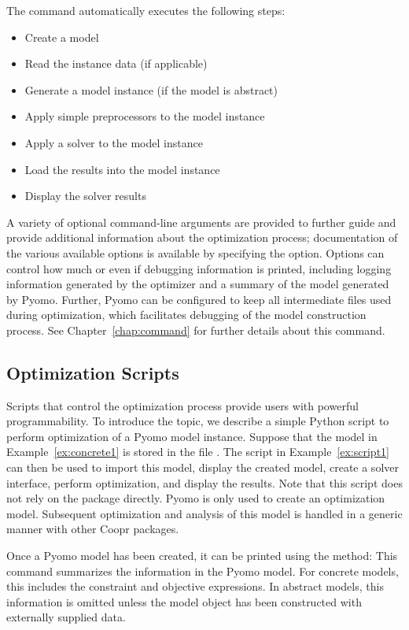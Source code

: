The  command automatically executes the following steps:
\begin{itemize}
\item Create a model
\item Read the instance data (if applicable)
\item Generate a model instance (if the model is abstract)
\item Apply simple preprocessors to the model instance
\item Apply a solver to the model instance
\item Load the results into the model instance
\item Display the solver results
\end{itemize}
A variety of optional command-line arguments are provided to further guide and 
provide additional information about the optimization process; documentation of
the various available options is available by specifying the  option.
Options can control how much or even if debugging information is printed, including 
logging information generated by the optimizer and a summary of the model generated 
by Pyomo. Further, Pyomo can be configured to keep all intermediate files used
during optimization, which facilitates debugging of the model construction process. 
See Chapter~\ref{chap:command} for further details about this command.


\subsection{Optimization Scripts \label{sec:optscripts}}

Scripts that control the optimization process provide users with powerful
programmability.  To introduce the topic, we describe a simple Python
script to perform optimization of a Pyomo model instance. Suppose
that the model in Example~\ref{ex:concrete1} is stored in the file
. The script in Example~\ref{ex:script1} can then be
used to import this model, display the created model, create a solver
interface, perform optimization, and display the results. Note that this
script does not rely on the  package directly. Pyomo
is only used to create an optimization model.  Subsequent optimization
and analysis of this model is handled in a generic manner with other
Coopr packages.

Once a Pyomo model has been created, it can be printed using the  method:
This command summarizes the information in the Pyomo model.  For concrete models, this 
includes the constraint and objective expressions. In abstract models, this information
is omitted unless the model object has been constructed with externally supplied data.

